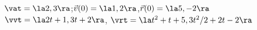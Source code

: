 {$\vat = \la 2,3\ra$;\quad $\vec v(0) = \la 1,2\ra$,\quad $\vec r(0) = \la 5,-2\ra$
}
{$\vvt = \la 2t+1,3t+2\ra$, $\vrt = \la t^2+t+5,3t^2/2+2t-2\ra$
}